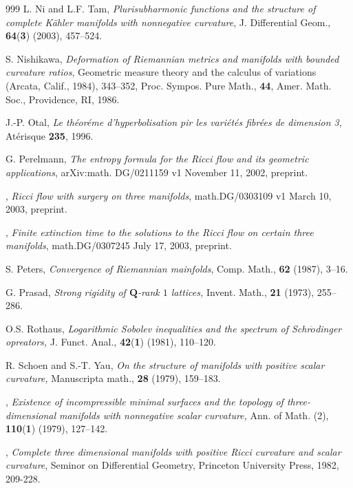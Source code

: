 \begin{thebibliography}{999}
 L. Ni and L.F. Tam,
{\it Plurisubharmonic functions and the structure of complete
K\"ahler manifolds with nonnegative curvature}, J. Differential
Geom., \textbf{64}({\bf 3}) (2003), 457--524.

 S. Nishikawa,
{\it Deformation of Riemannian metrics and manifolds with bounded
curvature ratios}, Geometric measure theory and the calculus of
variations (Arcata, Calif., 1984), 343--352, Proc. Sympos. Pure
Math., {\bf 44}, Amer. Math. Soc., Providence, RI, 1986.

 J.-P. Otal, {\it Le th\'eor\'eme d'hyperbolisation pir les
vari\'et\'es fibr\'ees de dimension 3},  At\'erisque {\bf 235},
1996.


 G. Perelmann,
{\it The entropy formula for the Ricci flow and its geometric
applications}, arXiv:math. DG/0211159 v1 November 11, 2002,
preprint.

 \bysame,
{\it Ricci flow with surgery on three manifolds}, math.DG/0303109
v1 March 10, 2003, preprint.

 \bysame,
{\it Finite extinction time to the solutions to the Ricci flow on
certain three manifolds}, math.DG/0307245 July 17, 2003, preprint.

 S. Peters,
{\it Convergence of Riemannian mainfolds}, Comp. Math.,
\textbf{62} (1987), 3--16.

 G. Prasad,
{\it Strong rigidity of $\mathbf{Q}$-rank $1$ lattices,} Invent.
Math., \textbf{21} (1973), 255--286.

 O.S. Rothaus,
{\it Logarithmic Sobolev inequalities and the
 spectrum of Schr$\ddot{o}$dinger opreators,}
J. Funct. Anal., \textbf{42}({\bf 1}) (1981), 110--120.

 R. Schoen and S.-T. Yau,
{\it On the structure of manifolds with positive scalar
curvature,} Manuscripta math., \textbf{28} (1979), 159--183.

 \bysame,
{\it Existence of incompressible minimal surfaces and the topology
of three-dimensional manifolds with nonnegative scalar curvature,}
Ann. of Math. (2), \textbf{110}({\bf 1}) (1979), 127--142.

 \bysame,
{\it Complete three dimensional manifolds with positive Ricci
curvature and scalar curvature}, Seminor on Differential Geometry,
Princeton University Press, 1982, 209-228.


\end{thebibliography}
